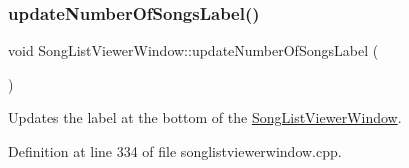 \subsubsection{\texorpdfstring{update\+Number\+Of\+Songs\+Label()}{updateNumberOfSongsLabel()}}
{\footnotesize\ttfamily void Song\+List\+Viewer\+Window\+::update\+Number\+Of\+Songs\+Label (\begin{DoxyParamCaption}{ }\end{DoxyParamCaption})\hspace{0.3cm}{\ttfamily [private]}}



Updates the label at the bottom of the \mbox{\hyperlink{class_song_list_viewer_window}{Song\+List\+Viewer\+Window}}. 



Definition at line 334 of file songlistviewerwindow.\+cpp.


